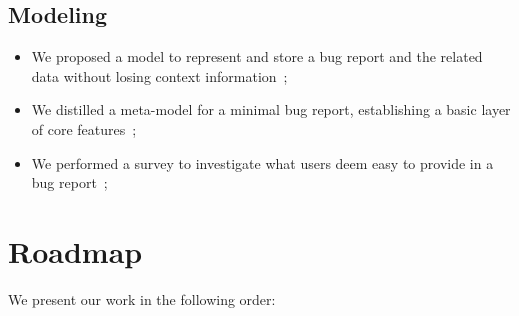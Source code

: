 

\subsection{Modeling}

\begin{itemize}
    \item We proposed a model to represent and store a bug report and the related data without losing context information~\cite{DalS2016a};

    \item We distilled a meta-model for a minimal bug report, establishing a basic layer of core features~\cite{DalS2016a};

    \item We performed a survey to investigate what users deem easy to provide in a bug report~\cite{DalS2016a};
\end{itemize}


\section{Roadmap}

We present our work in the following order:

